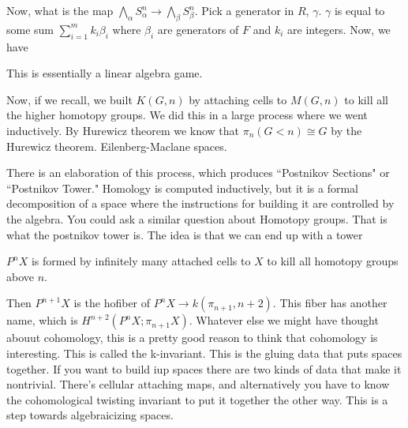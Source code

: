 \documentclass[10pt]{article}
\theoremstyle{definition}
\begin{document}
	Now, what is the map $\bigwedge_\alpha S_\alpha^n\to \bigwedge_\beta S_\beta^n$. Pick a generator in $R$, $\gamma$. $\gamma$ is equal to some sum $\sum_{i=1}^m k_i\beta_i$ where $\beta_i$ are generators of $F$ and $k_i$ are integers. Now, we have \begin{center}
	\end{center}
	
	This is essentially a linear algebra game.
	
	Now, if we recall, we built $K(G,n)$ by attaching cells to $M(G,n)$ to kill all the higher homotopy groups. We did this in a large process where we went inductively. By Hurewicz theorem we know that $\pi_n(G<n)\cong G$ by the Hurewicz theorem. Eilenberg-Maclane spaces. 
	
	There is an elaboration of this process, which produces ``Postnikov Sections" or ``Postnikov Tower." Homology is computed inductively, but it is a formal decomposition of a space where the instructions for building it are controlled by the algebra. You could ask a similar question about Homotopy groups. That is what the postnikov tower is. The idea is that we can end up with a tower \begin{center}
	\end{center}
	$P^nX$ is formed by infinitely many attached cells to $X$ to kill all homotopy groups above $n$. 
	\begin{center}
	\end{center}
	Then $P^{n+1} X$ is the hofiber of $P^nX\to k(\pi_{n+1}, n+2)$. This fiber has another name, which is $H^{n+2}(P^n X; \pi_{n+1}X)$. Whatever else we might have thought abouut cohomology, this is a pretty good reason to think that cohomology is interesting. This is called the k-invariant. This is the gluing data that puts spaces together. If you want to build iup spaces there are two kinds of data that make it nontrivial. There's cellular attaching maps, and alternatively you have to know the cohomological twisting invariant to put it together the other way. This is a step towards algebraicizing spaces. 
	
\end{document}
